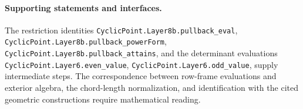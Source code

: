 \documentclass[11pt]{article}
\begin{document}
\paragraph{Supporting statements and interfaces.}
The restriction identities \texttt{CyclicPoint.\allowbreak Layer8b.\allowbreak pullback\_\allowbreak eval}, \texttt{CyclicPoint.\allowbreak Layer8b.\allowbreak pullback\_\allowbreak powerForm}, \texttt{CyclicPoint.\allowbreak Layer8b.\allowbreak pullback\_\allowbreak attains}, and the determinant evaluations \texttt{CyclicPoint.\allowbreak Layer6.\allowbreak even\_\allowbreak value}, \texttt{CyclicPoint.\allowbreak Layer6.\allowbreak odd\_\allowbreak value}, supply intermediate steps.
The correspondence between row-frame evaluations and exterior algebra, the chord-length normalization, and identification with the cited geometric constructions require mathematical reading.
\par\endgroup
\end{document}
